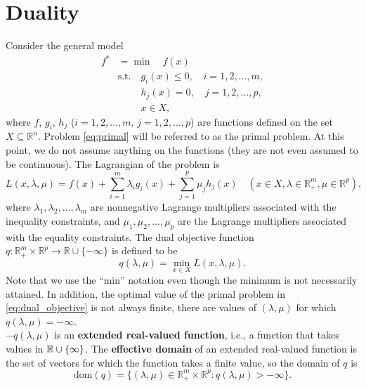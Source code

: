 \documentclass[10pt,a4paper]{article}
\begin{document}
\section{Duality}
Consider the general model
\begin{equation}\label{eq:primal}
	\begin{aligned}
		f^* &= \min \quad f(x) \\
		&\text{s.t.} \quad g_i(x) \leq 0, \quad i = 1, 2, \ldots, m, \\
		&\phantom{\text{s.t.}} \quad h_j(x) = 0, \quad j = 1, 2, \ldots, p, \\
		&\phantom{\text{s.t.}} \quad x \in X,
	\end{aligned}
\end{equation}
where $f$, $g_i$, $h_j$ ($i = 1, 2, \ldots, m$, $j = 1, 2, \ldots, p$) are functions defined on the set $X \subseteq \mathbb{R}^n$.
Problem \eqref{eq:primal} will be referred to as the primal problem. At this point, we do not assume
anything on the functions (they are not even assumed to be continuous). The Lagrangian
of the problem is
\begin{equation*}
	L(x, \lambda, \mu) = f(x) + \sum_{i=1}^{m} \lambda_i g_i(x) + \sum_{j=1}^{p} \mu_j h_j(x) \quad (x \in X, \lambda \in \mathbb{R}_+^m, \mu \in \mathbb{R}^p),
\end{equation*}
where $\lambda_1, \lambda_2, \ldots, \lambda_m$ are nonnegative Lagrange multipliers associated with the inequality constraints, and $\mu_1, \mu_2, \ldots, \mu_p$ are the Lagrange multipliers associated with the equality constraints. The dual objective function $q : \mathbb{R}_+^m \times \mathbb{R}^p \to \mathbb{R} \cup \{-\infty\}$ is defined to be
\begin{equation}\label{eq:dual_objective}
	q(\lambda, \mu) = \min_{x \in X} L(x, \lambda, \mu).
\end{equation}
Note that we use the ``min'' notation even though the minimum is not necessarily attained.
In addition, the optimal value of the primal problem in \eqref{eq:dual_objective} is not always finite, there are values of $(\lambda, \mu)$ for which $q(\lambda, \mu) = -\infty$.\\
$-q(\lambda, \mu)$ is an \textbf{extended real-valued function}, i.e., a function that takes values in $\mathbb{R} \cup \{\infty\}$. The \textbf{effective domain} of an extended real-valued function is the set of vectors for which the function takes a finite value, so the domain of $q$ is 
\begin{equation*}
	\text{dom}(q) = \{(\lambda, \mu) \in \mathbb{R}_+^m \times \mathbb{R}^p : q(\lambda, \mu) > -\infty\}.
\end{equation*}
\end{document}

